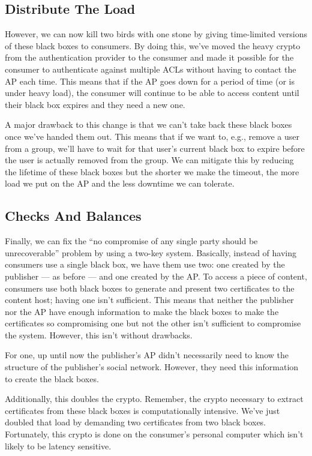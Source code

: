 \documentclass[pdftex,12pt,a4papaer]{report}
\begin{document}
\subsection{Distribute The Load}

However, we can now kill two birds with one stone by giving time-limited
versions of these black boxes to consumers. By doing this, we've moved the heavy
crypto from the authentication provider to the consumer and made it possible for
the consumer to authenticate against multiple ACLs without having to contact the
AP each time. This means that if the AP goes down for a period of time (or is
under heavy load), the consumer will continue to be able to access content until
their black box expires and they need a new one.

A major drawback to this change is that we can't take back these black boxes
once we've handed them out. This means that if we want to, e.g., remove a user
from a group, we'll have to wait for that user's current black box to expire
before the user is actually removed from the group. We can mitigate this by
reducing the lifetime of these black boxes but the shorter we make the timeout,
the more load we put on the AP and the less downtime we can tolerate.

\subsection{Checks And Balances}

Finally, we can fix the ``no compromise of any single party should be
unrecoverable'' problem by using a two-key system. Basically, instead of having
consumers use a single black box, we have them use two: one created by the
publisher --- as before --- and one created by the AP. To access a piece of
content, consumers use both black boxes to generate and present two certificates
to the content host; having one isn't sufficient. This means that neither the
publisher nor the AP have enough information to make the black boxes to make the
certificates so compromising one but not the other isn't sufficient to
compromise the system. However, this isn't without drawbacks.

For one, up until now the publisher's AP didn't necessarily need to know the
structure of the publisher's social network. However, they need this information
to create the black boxes.

Additionally, this doubles the crypto. Remember, the crypto necessary to extract
certificates from these black boxes is computationally intensive. We've just
doubled that load by demanding two certificates from two black boxes.
Fortunately, this crypto is done on the consumer's personal computer which isn't
likely to be latency sensitive.
\end{document}
